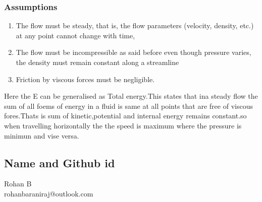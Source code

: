 \subsubsection{Assumptions}
\begin{enumerate}
	\item The flow must be steady, that is, the flow parameters (velocity, density, etc.) at any point cannot change with time,
	\item The flow must be incompressible as said before even though pressure varies, the density must remain constant along a streamline
        \item Friction by viscous forces must be negligible.
\end{enumerate}
Here the E can be generalised as Total energy.This states that ina steady flow the sum of all foems of energy in a fluid is same at all points that are free of viscous fores.Thats is sum of kinetic,potential and internal energy remains constant.so when travelling horizontally the
the speed is maximum where the pressure is minimun and vise versa.



\subsection{Name and Github id}
Rohan B \\ 
rohanbaraniraj@outlook.com







